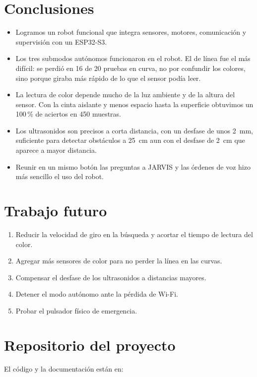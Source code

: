 \documentclass[journal]{IEEEtran}
\begin{document}
\section{Conclusiones}

\begin{itemize}
    \item Logramos un robot funcional que integra sensores, motores, comunicación y supervisión con un ESP32-S3.
    \item Los tres submodos autónomos funcionaron en el robot. El de línea fue el más difícil: se perdió en 16 de 20 pruebas en curva, no por confundir los colores, sino porque giraba más rápido de lo que el sensor podía leer.
    \item La lectura de color depende mucho de la luz ambiente y de la altura del sensor. Con la cinta aislante y menos espacio hasta la superficie obtuvimos un 100\,\% de aciertos en 450 muestras.
    \item Los ultrasonidos son precisos a corta distancia, con un desfase de unos 2~mm, suficiente para detectar obstáculos a 25~cm aun con el desfase de 2~cm que aparece a mayor distancia.
    \item Reunir en un mismo botón las preguntas a JARVIS y las órdenes de voz hizo más sencillo el uso del robot.
\end{itemize}

\section{Trabajo futuro}

\begin{enumerate}[1.]
    \item Reducir la velocidad de giro en la búsqueda y acortar el tiempo de lectura del color.
    \item Agregar más sensores de color para no perder la línea en las curvas.
    \item Compensar el desfase de los ultrasonidos a distancias mayores.
    \item Detener el modo autónomo ante la pérdida de Wi-Fi.
    \item Probar el pulsador físico de emergencia.
\end{enumerate}

\section{Repositorio del proyecto}

El código y la documentación están en:
\end{document}
